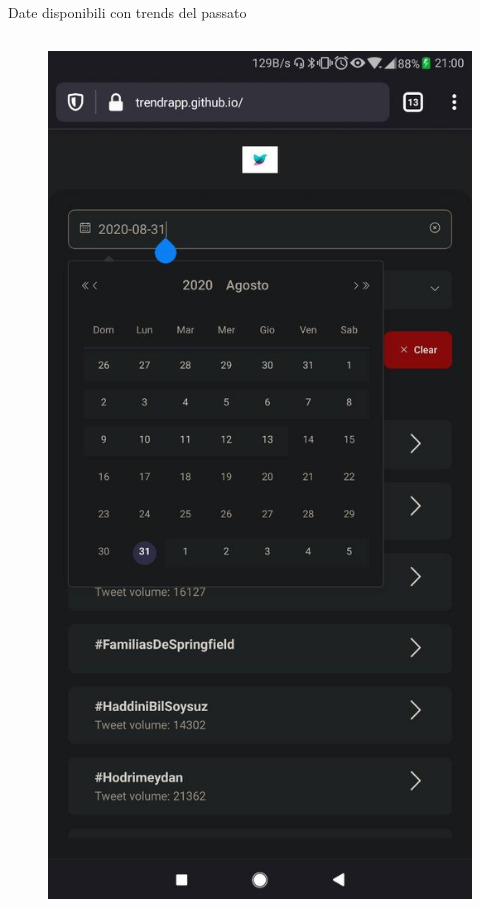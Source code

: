 \documentclass[xcolor=svgnames, aspectratio=169]{beamer}
\begin{document}
\begin{frame}{Date disponibili con trends del passato}
\begin{columns}[t]
        \vspace*{-12pt}
        \begin{figure}[H]
            \centering\includegraphics[width=0.32\paperwidth,height=0.65\paperheight,keepaspectratio]{Mobile_Firefox_Ricerca_Scelta_data.jpg}

\end{figure}
\end{columns}
\end{frame}
\end{document}
